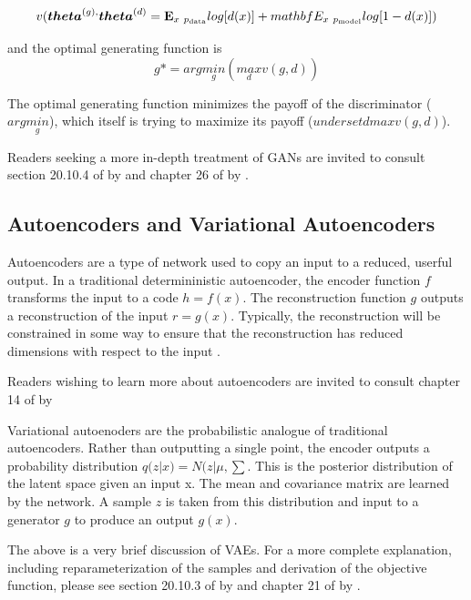 \documentclass{article}
\begin{document}
\[v(\vb*{theta}^{(g),}\vb*{theta}^{(d)} = \mathbf{E}_{x~p_{\text{data}}}log[d(x)] + mathbf{E}_{x~p_{\text{model}}}log[1-d(x)])\]

and the optimal generating function \cite{Goodfellow-et-al-2016} is
\[g* = arg\underset{g}{min}(\underset{d}{max}v(g,d))\]

The optimal generating function minimizes the payoff of the discriminator (\( arg\underset{g}{min}\)), which itself is trying to maximize its payoff (\(underset{d}{max}v(g,d)\)).

Readers seeking a more in-depth treatment of GANs are invited to consult section 20.10.4 of  by \citeauthor{Goodfellow-et-al-2016} and chapter 26 of  by \citeauthor{pml2Book}.

\subsection{Autoencoders and Variational Autoencoders}

Autoencoders are a type of network used to copy an input to a reduced, userful output. In a traditional determininistic autoencoder, the encoder function \(f\) transforms the input to a code \(h = f(x)\). The reconstruction function \(g\) outputs a reconstruction of the input \(r = g(x)\). Typically, the reconstruction will be constrained in some way to ensure that the reconstruction has reduced dimensions with respect to the input \cite{Goodfellow-et-al-2016}.

Readers wishing to learn more about autoencoders are invited to consult chapter 14 of  by 

Variational autoenoders are the probabilistic analogue of traditional autoencoders. Rather than outputting a single point, the encoder outputs a probability distribution \(q(z|x) = N(z|\mu , \sum\). This is the posterior distribution of the latent space given an input x. The mean and covariance matrix are learned by the network. A sample \(z\) is taken from this distribution and input to a generator \(g\) to produce an output \(g(x)\).

The above is a very brief discussion of VAEs. For a more complete explanation, including reparameterization of the samples and derivation of the objective function, please see section 20.10.3 of  by \citeauthor{Goodfellow-et-al-2016} and chapter 21 of  by \citeauthor{pml2Book}.
\newpage


\printbibliography
\end{document}
